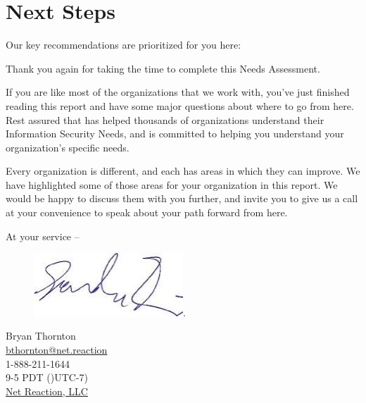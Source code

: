 \documentclass{needs}
\begin{document}
		\section{Next Steps}
		
		 Our key recommendations are prioritized for you here:
		\listSteps
		
		Thank you again for taking the time to complete this Needs Assessment. 
		
		If you are like most of the organizations that we work with, you’ve just finished reading this report and have some major questions about where to go from here.  Rest assured that \emph{\theauthor} has helped thousands of organizations understand their Information Security Needs, and is committed to helping you understand your organization’s specific needs.
		
		Every organization is different, and each has areas in which they can improve.  We have highlighted some of those areas for your organization in this report.  We would be happy to discuss them with you further, and invite you to give us a call at your convenience to speak about your path forward from here.
		
			At your service --
			
			\begin{figure}[h]
				\includegraphics[width = 0.5\textwidth]{sign}.
			\end{figure}
			Bryan Thornton \\
			\href{mailto:bthornton@net.reaction}{bthornton@net.reaction} \\
			1-888-211-1644 \\
			9-5 PDT ()UTC-7)\\
			\href{https://www.netreaction.com/}{Net Reaction, LLC}
					
\end{document}
